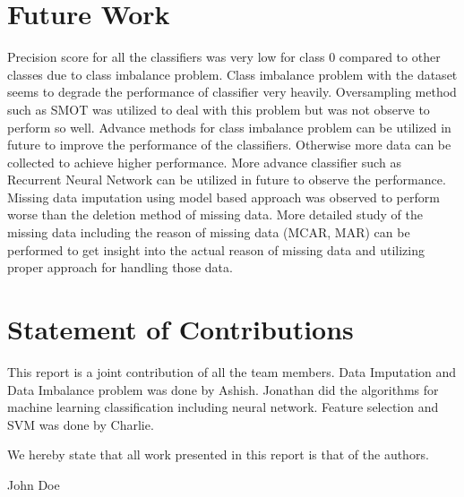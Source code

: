 \documentclass[conference]{IEEEtran}
\begin{document}
\section{Future Work}

Precision score for all the classifiers was very low for class 0 compared to other classes due to class imbalance problem. Class imbalance problem with the dataset seems to degrade the performance of classifier very heavily. Oversampling method such as SMOT was utilized to deal with this problem but was not observe to perform so well. Advance methods for class imbalance problem can be utilized in future to improve the performance of the classifiers. Otherwise more data can be collected to achieve higher performance. More advance classifier such as Recurrent Neural Network can be utilized in future to observe the performance. Missing data imputation using model based approach was observed to perform worse than the deletion method of missing data. More detailed study of the missing data including the reason of missing data (MCAR, MAR) can be performed to get insight into the actual reason of missing data and utilizing proper approach for handling those data.

\appendices
\section{Statement of Contributions}
This report is a joint contribution of all the team members. Data Imputation and Data Imbalance problem was done by Ashish. Jonathan did the algorithms for machine learning classification including neural network. Feature selection and SVM was done by Charlie.

We hereby state that all work presented in this report is that of the authors.

\printbibliography

\begin{IEEEbiography}{John Doe}
\blindtext
\end{IEEEbiography}
\end{document}
